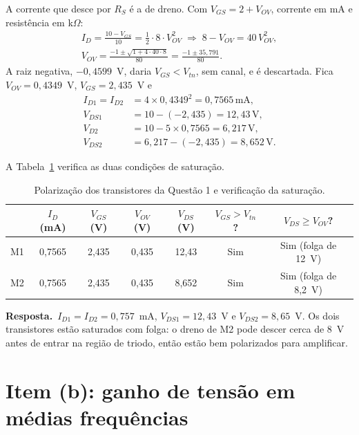 \documentclass[12pt,a4paper]{report}
\newcommand{\un}[1]{\,\mathrm{#1}}
\newcommand{\resposta}{\par\smallskip\noindent\textbf{Resposta.}\ }
\begin{document}
A corrente que desce por $R_S$ é a de dreno. Com $V_{GS} = 2 + V_{OV}$, corrente em mA e resistência em k$\Omega$:
\begin{gather*}
I_D = \frac{10 - V_{GS}}{10} = \frac12\cdot8\cdot V_{OV}^2
\;\Rightarrow\; 8 - V_{OV} = 40\,V_{OV}^2,\\[2pt]
V_{OV} = \frac{-1\pm\sqrt{1+4\cdot40\cdot8}}{80} = \frac{-1\pm35{,}791}{80}.
\end{gather*}
A raiz negativa, $-0{,}4599$~V, daria $V_{GS} < V_{tn}$, sem canal, e é descartada. Fica $V_{OV} = 0{,}4349$~V, $V_{GS} = 2{,}435$~V e
\begin{align*}
I_{D1} = I_{D2} &= 4\times0{,}4349^2 = 0{,}7565\un{mA},\\[4pt]
V_{DS1} &= 10 - (-2{,}435) = 12{,}43\un{V},\\[4pt]
V_{D2} &= 10 - 5\times0{,}7565 = 6{,}217\un{V},\\[4pt]
V_{DS2} &= 6{,}217 - (-2{,}435) = 8{,}652\un{V}.
\end{align*}

A Tabela~\ref{tab:q1-cc} verifica as duas condições de saturação.

\begin{table}[H]
\centering
\caption{Polarização dos transistores da Questão 1 e verificação da saturação.}
\label{tab:q1-cc}
\begin{tabular}{lcccccc}
\toprule
 & $I_D$ (mA) & $V_{GS}$ (V) & $V_{OV}$ (V) & $V_{DS}$ (V) & $V_{GS}>V_{tn}$? & $V_{DS}\geq V_{OV}$? \\
\midrule
M1 & 0,7565 & 2,435 & 0,435 & 12,43 & Sim & Sim (folga de 12~V) \\
M2 & 0,7565 & 2,435 & 0,435 & 8,652 & Sim & Sim (folga de 8,2~V) \\
\bottomrule
\end{tabular}
\end{table}

\resposta $I_{D1} = I_{D2} = 0{,}757$~mA, $V_{DS1} = 12{,}43$~V e $V_{DS2} = 8{,}65$~V. Os dois transistores estão saturados com folga: o dreno de M2 pode descer cerca de 8~V antes de entrar na região de triodo, então estão bem polarizados para amplificar.

\section{Item (b): ganho de tensão em médias frequências}
\end{document}
